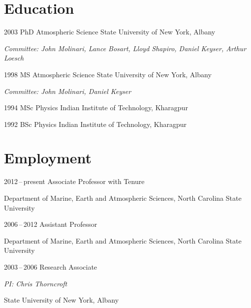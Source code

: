 \section*{Education}

\begin{tlist}


\item[2003] PhD \hspace{3mm} Atmospheric Science \hspace{4mm} State University of New York, Albany
  
      {\small \emph{Committee: John Molinari, Lance Bosart, Lloyd Shapiro, Daniel Keyser, Arthur Loesch}}
      \vspace{2mm}
      
\item[1998] MS  \hspace{5mm} Atmospheric Science \hspace{4mm} State University of New York, Albany
  
        {\small \emph{Committee: John Molinari, Daniel Keyser}}
        \vspace{2mm}
        
\item[1994] MSc \hspace{4mm}  Physics \hspace{25mm} Indian Institute of Technology, Kharagpur
  \vspace{2mm}
  
\item[1992] BSc \hspace{5mm} Physics \hspace{25mm} Indian Institute of Technology, Kharagpur
\end{tlist}

\section*{Employment}

\begin{tlist}
\item[2012\,--\,present] Associate Professor with Tenure
  
  Department of Marine, Earth and Atmospheric Sciences,  North Carolina State University
      \vspace{2mm}

\item[2006\,--\,2012] Assistant Professor

  Department of Marine, Earth and Atmospheric Sciences, North Carolina State University
      \vspace{2mm}

\item[2003\,--\,2006] Research Associate
  
  {\small \emph {PI: Chris Thorncroft}}

  State University of New York, Albany
  
  
\end{tlist}

